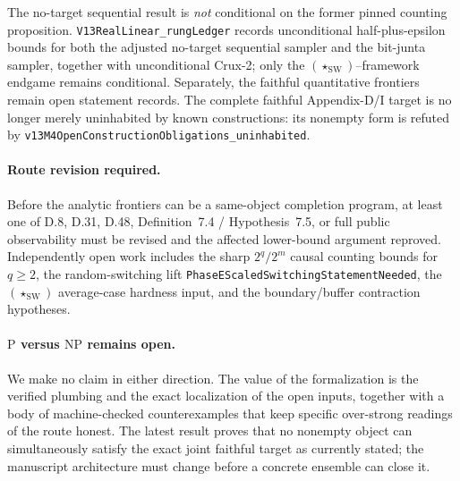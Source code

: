 \documentclass[11pt]{article}
\theoremstyle{definition}
\newcommand{\StarSW}{(\star_{\mathrm{SW}})}
\begin{document}
The no-target sequential result is \emph{not} conditional on the former pinned
counting proposition.  \texttt{V13RealLinear\_rungLedger} records unconditional
half-plus-epsilon bounds for both the adjusted no-target sequential sampler and the
bit-junta sampler, together with unconditional Crux-2; only the
$\StarSW$--framework endgame remains conditional.  Separately, the faithful
quantitative frontiers remain open statement records. The complete faithful
Appendix-D/I target is no longer merely uninhabited by known constructions: its
nonempty form is refuted by
\texttt{v13M4OpenConstructionObligations\_uninhabited}.

\paragraph{Route revision required.} Before the analytic frontiers can be a
same-object completion program, at least one of D.8, D.31, D.48, Definition~7.4
/ Hypothesis~7.5, or full public observability must be revised and the affected
lower-bound argument reproved. Independently open work includes the sharp
$2^q/2^m$ causal counting bounds for $q\ge2$, the random-switching lift
\texttt{PhaseEScaledSwitchingStatementNeeded}, the $\StarSW$ average-case hardness
input, and the boundary/buffer contraction hypotheses.

\paragraph{$\mathrm{P}$ versus $\mathrm{NP}$ remains open.} We make no claim in
either direction. The value of the formalization is the verified plumbing and the
exact localization of the open inputs, together with a body of machine-checked
counterexamples that keep specific over-strong readings of the route honest. The
latest result proves that no nonempty object can simultaneously satisfy the exact
joint faithful target as currently stated; the manuscript architecture must change
before a concrete ensemble can close it.
\end{document}
